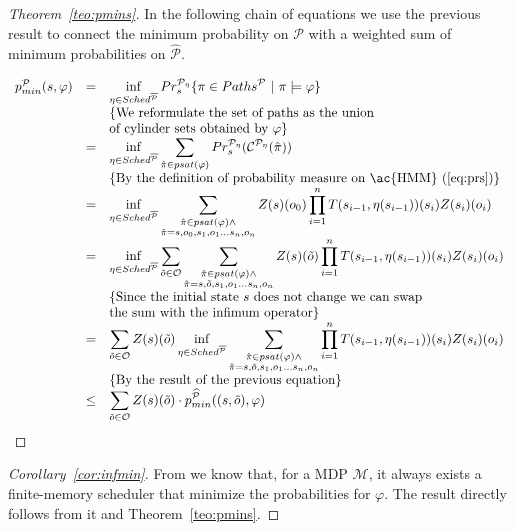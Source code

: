 \begin{proof}[Theorem~\ref{teo:pmins}]
In the following chain of equations we use the previous result to connect the minimum probability on $\mathcal{P}$ with a weighted sum of minimum probabilities on $\widehat{\mathcal{P}}$. %

$$
\begin{array}{lll}
	p^{\mathcal{P}}_{min}(s,\varphi) &=& \displaystyle \inf_{\eta \in Sched^{\mathcal{\overline{P}}}} Pr_s^{\mathcal{P}_{\eta}}\{\pi \in Paths^{\mathcal{P}}\ |\ \pi \models \varphi\} \\
	&& \{ \text{We reformulate the set of paths as the union} \\ 
	&& \text{of cylinder sets obtained by $\varphi$} \} \\
	&=& \displaystyle \inf_{\eta \in Sched^{\mathcal{\overline{P}}}} \sum_{\hat\pi \in psat(\varphi)} Pr_s^{\mathcal{P}_\eta}(\mathcal{C}^{\mathcal{P}_\eta}(\hat\pi)) \\
	&& \{ \text{By the definition of probability measure on \ac{HMM} (\ref{eq:prs})} \} \\
	&=& \displaystyle \inf_{\eta \in Sched^{\mathcal{\overline{P}}}} \sum_{\substack{\hat\pi \in psat(\varphi) \wedge \\ \hat\pi = s,o_0,s_1,o_1\dots s_n,o_n}} Z(s)(o_0) \prod_{i=1}^n T(s_{i-1},\eta(s_{i-1}))(s_i) Z(s_i)(o_i) \\
	&=& \displaystyle \inf_{\eta \in Sched^{\mathcal{\overline{P}}}} \sum_{\tilde{o}\in\mathcal{O}} \sum_{\substack{\hat\pi \in psat(\varphi) \wedge \\ \hat\pi = s,\tilde{o},s_1,o_1\dots s_n,o_n}} Z(s)(\tilde{o}) \prod_{i=1}^n T(s_{i-1},\eta(s_{i-1}))(s_i) Z(s_i)(o_i) \\
	&& \{\text{Since the initial state $s$ does not change we can swap} \\ 
	&& \text{the sum with the infimum operator}\} \\
	&=& \displaystyle \sum_{\tilde{o}\in\mathcal{O}} Z(s)(\tilde{o}) \inf_{\eta \in Sched^{\mathcal{\overline{P}}}}  \sum_{\substack{\hat\pi \in psat(\varphi) \wedge \\ \hat\pi = s,\tilde{o},s_1,o_1\dots s_n,o_n}} \prod_{i=1}^n T(s_{i-1},\eta(s_{i-1}))(s_i) Z(s_i)(o_i) \\
	&& \{\text{By the result of the previous equation}\} \\

	&\leq& \displaystyle \sum_{\tilde{o}\in\mathcal{O}} Z(s)(\tilde{o}) \cdot p_{min}^{\widehat{\mathcal{P}}}((s,\tilde{o}),\varphi) \\
\end{array}
$$
\end{proof}
\begin{proof}[Corollary~\ref{cor:infmin}]
From \cite[Lemma 10.102]{Katoen-Baier} we know that, for a \ac{MDP} $\mathcal{M}$, it always exists a finite-memory scheduler that minimize the probabilities for $\varphi$. The result directly follows from it and Theorem~\ref{teo:pmins}.
\end{proof}
